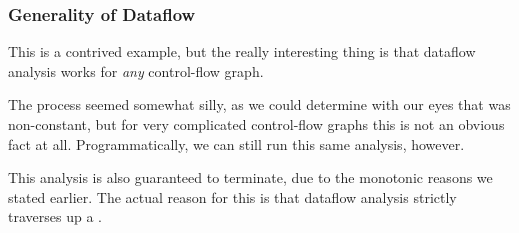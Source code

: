 \documentclass[aspectratio=169, handout]{beamer}
\begin{document}
 \begin{frame}[fragile]
   \frametitle{Generality of Dataflow}

   This is a contrived example, but the really interesting thing is that
   dataflow analysis works for \textit{any} control-flow graph.

   \pause
   \vspace{\fill}

   The process seemed somewhat silly, as we could determine with our eyes that
    was non-constant, but for very complicated control-flow graphs this
   is not an obvious fact at all. Programmatically, we can still run this same
   analysis, however.

   \pause
   \vspace{\fill}

   This analysis is also guaranteed to terminate, due to the monotonic reasons
   we stated earlier. The actual reason for this is that dataflow analysis
   strictly traverses up a .
 \end{frame}
\end{document}
